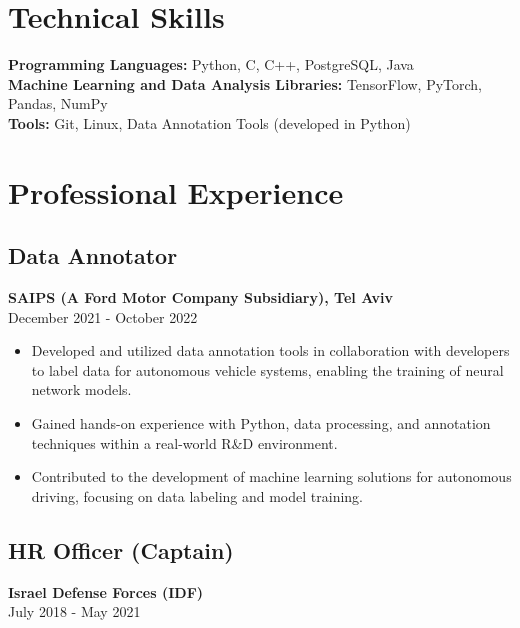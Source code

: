 \documentclass[a4paper,10pt]{article}
\begin{document}
\vspace{0.5cm}

\section{Technical Skills}

\textbf{Programming Languages:} Python, C, C++, PostgreSQL, Java \\
\textbf{Machine Learning and Data Analysis Libraries:} TensorFlow, PyTorch, Pandas, NumPy \\
\textbf{Tools:} Git, Linux, Data Annotation Tools (developed in Python)

\vspace{0.5cm}

\section{Professional Experience}

\subsection{Data Annotator}

\textbf{SAIPS (A Ford Motor Company Subsidiary), Tel Aviv} \\
December 2021 - October 2022

\begin{itemize}[noitemsep]
\item Developed and utilized data annotation tools in collaboration with developers to label data for autonomous vehicle systems, enabling the training of neural network models.
\item Gained hands-on experience with Python, data processing, and annotation techniques within a real-world R\&D environment.
\item Contributed to the development of machine learning solutions for autonomous driving, focusing on data labeling and model training.
\end{itemize}

\vspace{0.5cm}

\subsection{HR Officer (Captain)}

\textbf{Israel Defense Forces (IDF)} \\
July 2018 - May 2021
\end{document}

